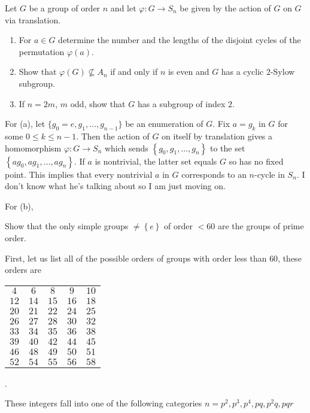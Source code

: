 \begin{problem}
  Let \(G\) be a group of order \(n\) and let \(\varphi\colon G\to S_n\) be
  given by the action of \(G\) on \(G\) via translation.
  \begin{enumerate}[label=(\alph*),noitemsep]
  \item For \(a\in G\) determine the number and the lengths of the disjoint
    cycles of the permutation \(\varphi(a)\).
  \item Show that \(\varphi(G)\nsubseteq A_n\) if and only if \(n\) is even
    and \(G\) has a cyclic \(2\)-Sylow subgroup.
  \item If \(n=2m\), \(m\) odd, show that \(G\) has a subgroup of index
    \(2\).
  \end{enumerate}
\end{problem}
\begin{solution}
  For (a), let \(\{g_0=e,g_1,\dotsc,g_{n-1}\}\) be an enumeration of
  \(G\). Fix \(a=g_k\) in \(G\) for some \(0\leq k\leq n-1\). Then the
  action of \(G\) on itself by translation gives a homomorphism
  \(\varphi\colon G\to S_n\) which sends
  \(\left\{g_0,g_1,\dotsc,g_n\right\}\) to the set
  \(\left\{ag_0,ag_1,\dotsc,ag_n\right\}\). If \(a\) is nontrivial, the
  latter set equals \(G\) so has no fixed point. This implies that every
  nontrivial \(a\) in \(G\) corresponds to an \(n\)-cycle in \(S_n\). I
  don't know what he's talking about so I am just moving on.

  For (b),
\end{solution}

\begin{problem}
  Show that the only simple groups \(\neq\left\{e\right\}\) of order
  \(<60\) are the groups of prime order.
\end{problem}
\begin{solution}
  First, let us list all of the possible orders of groups with order less
  than \(60\), these orders are
  \begin{center}
    \begin{tabular}{ccccc}
      \(4\)&\(6\)&\(8\)&\(9\)&\(10\)\\
      \(12\)&\(14\)&\(15\)&\(16\)&\(18\)\\
      \(20\)&\(21\)&\(22\)&\(24\)&\(25\)\\
      \(26\)&\(27\)&\(28\)&\(30\)&\(32\)\\
      \(33\)&\(34\)&\(35\)&\(36\)&\(38\)\\
      \(39\)&\(40\)&\(42\)&\(44\)&\(45\)\\
      \(46\)&\(48\)&\(49\)&\(50\)&\(51\)\\
      \(52\)&\(54\)&\(55\)&\(56\)&\(58\)
    \end{tabular}.
  \end{center}
  These integers fall into one of the following categories
  \(n=p^2,p^3,p^4,pq,p^2q,pqr\)
\end{solution}

